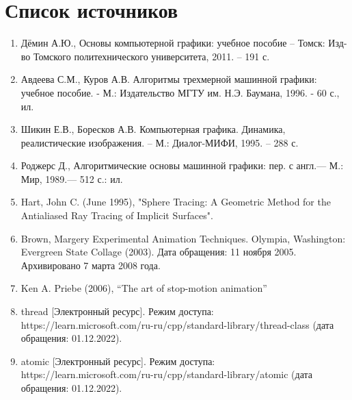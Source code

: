 
\chapter*{Список источников }


\begin {enumerate}

\item  Дёмин А.Ю., Основы компьютерной графики: учебное пособие – Томск: Изд-во Томского политехнического университета, 2011. – 191 с.

\item  Авдеева С.М., Куров А.В. Алгоритмы трехмерной машинной графики: учебное пособие. - М.: Издательство МГТУ им. Н.Э. Баумана, 1996. - 60 с., ил.

\item  Шикин Е.В., Боресков А.В. Компьютерная графика. Динамика, реалистические изображения. – М.: Диалог-МИФИ, 1995. – 288 с.

\item  Роджерс Д., Алгоритмические основы машинной графики: пер. с англ.— М.: Мир, 1989.— 512 с.: ил.

\item  Hart, John C. (June 1995), "Sphere Tracing: A Geometric Method for the Antialiased Ray Tracing of Implicit Surfaces".

\item  Brown, Margery Experimental Animation Techniques. Olympia, Washington: Evergreen State Collage (2003). Дата обращения: 11 ноября 2005. Архивировано 7 марта 2008 года.

\item Ken A. Priebe (2006), “The art of stop-motion animation”

\item thread [Электронный ресурс]. Режим доступа: https://learn.microsoft.com/ru-ru/cpp/standard-library/thread-class (дата обращения: 01.12.2022).

\item atomic [Электронный ресурс]. Режим доступа: https://learn.microsoft.com/ru-ru/cpp/standard-library/atomic (дата обращения: 01.12.2022).

\end {enumerate}
